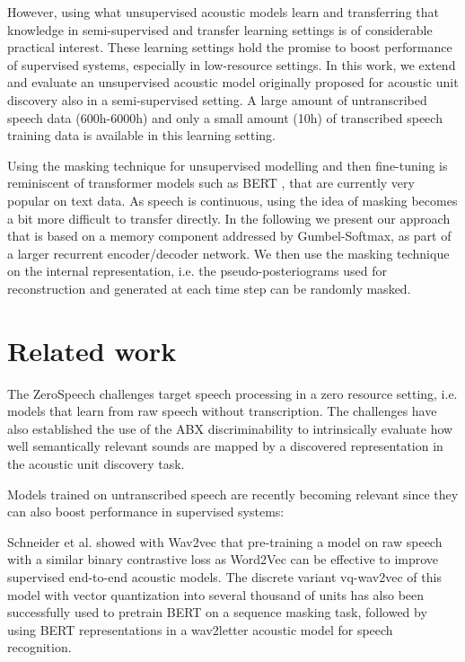 \documentclass[a4paper]{article}
\begin{document}
However, using what unsupervised acoustic models learn and transferring that knowledge in semi-supervised and transfer learning settings is of considerable practical interest. These learning settings hold the promise to boost performance of supervised systems, especially in low-resource settings. In this work, we extend and evaluate an unsupervised acoustic model originally proposed for acoustic unit discovery also in a semi-supervised setting. A large amount of untranscribed speech data (600h-6000h) and only a small amount (10h) of transcribed speech training data is available in this learning setting.

Using the masking technique for unsupervised modelling and then fine-tuning is reminiscent of transformer models such as BERT \cite{devlinetal2019bert}, that are currently very popular on text data. As speech is continuous, using the idea of masking becomes a bit more difficult to transfer directly. In the following we present our approach that is based on a memory component addressed by Gumbel-Softmax, as part of a larger recurrent encoder/decoder network. We then use the masking technique on the internal representation, i.e. the pseudo-posteriograms used for reconstruction and generated at each time step can be randomly masked.

\section{Related work}

The ZeroSpeech challenges \cite{versteegh2015zero, dunbar2017zero, dunbar2019zero} target speech processing in a zero resource setting, i.e. models that learn from raw speech without transcription. The challenges have also established the use of the ABX discriminability \cite{schatz2013evaluating, schatz2016abx} to intrinsically evaluate how well semantically relevant sounds are mapped by a discovered representation in the acoustic unit discovery task. 

Models trained on untranscribed speech are recently becoming relevant since they can also boost performance in supervised systems:

Schneider et al. \cite{schneider2019wav2vec} showed with Wav2vec that pre-training a model on raw speech with a similar binary contrastive loss as Word2Vec \cite{mikolov2013distributed} can be effective to improve supervised end-to-end acoustic models. The discrete variant vq-wav2vec \cite{baevski2019vq, baevski2020effectiveness} of this model with vector quantization into several thousand of units has also been successfully used to pretrain BERT \cite{devlinetal2019bert} on a sequence masking task, followed by using BERT representations in a wav2letter \cite{collobert2016wav2letter} acoustic model for speech recognition.
\end{document}
